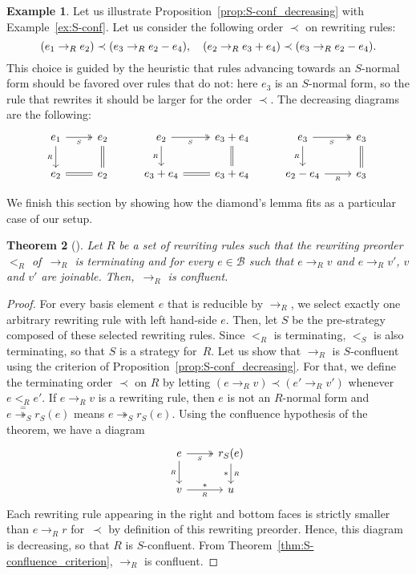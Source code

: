 \documentclass[11pt]{article}
\newtheorem{theorem}{Theorem}[section]
\theoremstyle{definition}
\newtheorem{example}[theorem]{Example}
\newcommand\basis{\mathscr{B}}
\newcommand\ordS{<_S}
\newcommand\rewR{\to_R}
\newcommand\parS{\twoheadrightarrow_S}
\begin{document}
\begin{example}\label{ex:end_to_example}
  Let us illustrate Proposition~\ref{prop:S-conf_decreasing} with
  Example~\ref{ex:S-conf}. Let us consider the following order $\prec$ on
  rewriting rules:
  \[(e_1\rewR e_2)\prec(e_3\rewR e_2-e_4),\quad(e_2\rewR e_3+e_4)\prec
  (e_3\rewR e_2-e_4).
  \smallskip\]
  This choice is guided by the heuristic that rules advancing towards an
  $S$-normal form should be favored over rules that do not: here $e_3$ is
  an $S$-normal form, so the rule that rewrites it should be larger for
  the order $\prec$. The decreasing diagrams are the following:
  \[\begin{tikzcd}
  e_1\ar[d, "_R"']\ar[r, twoheadrightarrow, "_S"'] &
  e_2\ar[d, equal] & e_2\ar[d, "_R"']
  \ar[r, twoheadrightarrow, "_S"'] & e_3+e_4\ar[d, equal] &
  e_3\ar[d, "_R"']\ar[r, twoheadrightarrow, "_S"'] & e_3\ar[d,equal]\\
  e_2\ar[r, equal] & e_2 & e_3+e_4\ar[r, equal] & e_3+e_4 & e_2-e_4
  \ar[r,  "_R"'] & e_3
  \end{tikzcd}\]
\end{example}
\smallskip

We finish this section by showing how the diamond's lemma fits as a
particular case of our setup.
\medskip

\begin{theorem}[\cite{MR506890}]\label{thm:diamond_lemma}
  Let $R$ be a set of rewriting rules such that the rewriting preorder
  $<_R$ of~$\rewR$ is terminating and for every $e\in\basis$ such that
  $e\rewR v$ and $e\rewR v'$, $v$ and $v'$ are joinable. Then,~$\rewR$ is
  confluent.
\end{theorem}

\begin{proof}
  For every basis element $e$ that is reducible by $\rewR$, we select
  exactly one arbitrary rewriting rule with left hand-side
  $e$. Then, let $S$ be the pre-strategy composed of these selected
  rewriting rules. Since $<_R$ is terminating, $\ordS$ is also
  terminating, so that $S$ is a strategy for~$R$. Let us show that
  $\rewR$ is $S$-confluent using the criterion of
  Proposition~\ref{prop:S-conf_decreasing}. For that, we define the
  terminating order $\prec$ on $R$ by letting
  $(e\rewR v)\prec(e'\rewR v')$  whenever $e<_Re'$. If $e\rewR v$ is a
  rewriting rule, then $e$ is not an $R$-normal form and
  $e\overset{=}{\parS}r_S(e)$ means $e\parS r_S(e)$. Using the confluence
  hypothesis of the theorem, we have a diagram
  \[\begin{tikzcd}
  e\ar[d, "_R"']\ar[r, twoheadrightarrow, "_S"'] &
  r_S(e)\ar[d, rightarrow, "*"', "_R"]\\
  v\ar[r, rightarrow, "*", "_R"'] & u
  \end{tikzcd}\]
  Each rewriting rule appearing in the right and bottom faces is strictly
  smaller than $e\rewR r$ for~$\prec$ by definition of this rewriting
  preorder. Hence, this diagram is decreasing, so that $R$ is
  $S$-confluent. From Theorem~\ref{thm:S-confluence_criterion}, $\rewR$
  is confluent.   
\end{proof}
\smallskip
\end{document}

